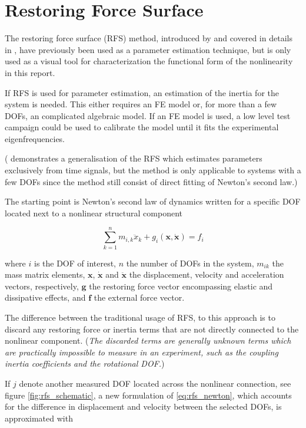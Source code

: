 \section{Restoring Force Surface}
\label{sec:rfs_description}

The restoring force surface (RFS) method, introduced by \cite{masri1979a} and
covered in details in \autocite{worden1990a}, have previously been used
as a parameter estimation technique, but is only used as a visual tool for
characterization the functional form of the nonlinearity in this report.

If RFS is used for parameter estimation, an estimation of the inertia for the
system is needed. This either requires an FE model or, for more than a few DOFs,
an complicated algebraic model. If an FE model is used, a low level test campaign
could be used to calibrate the model until it fits the experimental
eigenfrequencies.

(\autocite{masri2004a} demonstrates a generalisation of the RFS which estimates
parameters exclusively from time signals, but the method is only applicable to
systems with a few DOFs since the method still consist of direct fitting of
Newton's second law.)


The starting point is Newton's second law of dynamics written for a specific DOF
located next to a nonlinear structural component

\begin{equation}
  \label{eq:rfs_newton}
  \sum_{k=1}^{n} m_{i,k} \ddot x_k + g_i(\bm x, \dot{ \bm x}) = f_i
\end{equation}

where $i$ is the DOF of interest, $n$ the number of DOFs in the system, $m_{ik}$
the mass matrix elements, $\bm x$, $\dot{\bm x}$ and $\ddot{ \bm x}$ the
displacement, velocity and acceleration vectors, respectively, $\bm g$ the
restoring force vector encompassing elastic and dissipative effects, and $\bm f$
the external force vector.

The difference between the traditional usage of RFS, to this approach is to
discard any restoring force or inertia terms that are not directly connected to
the nonlinear component. (\textit{The discarded terms are generally unknown
  terms which are practically impossible to measure in an experiment, such as
  the coupling inertia coefficients and the rotational DOF.})

If $j$ denote another measured DOF located across the nonlinear connection, see
figure \ref{fig:rfs_schematic}, a new formulation of \eqref{eq:rfs_newton},
which accounts for the difference in displacement and velocity between the
selected DOFs, is approximated with

